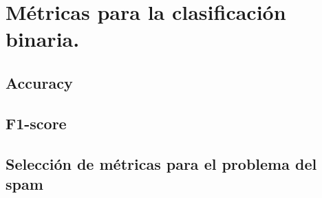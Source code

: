 \pagebreak
\section{Métricas para la clasificación binaria.}

\subsection{Accuracy}

\subsection{F1-score}

\subsection{Selección de métricas para el problema del spam}